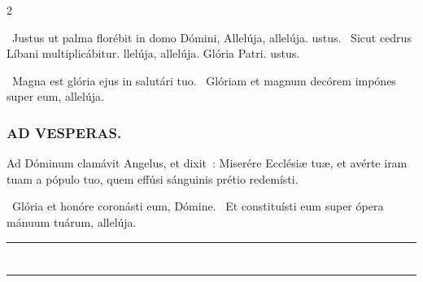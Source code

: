 \documentclass[9pt,twoside]{extarticle}
\begin{document}
\begin{multicols}{2}
\begin{tightlist}{}
\item {}~Justus ut palma florébit in domo Dómini, \textred{*} Allelúja, allelúja. ustus.
~Sicut cedrus Líbani multiplicábitur. llelúja, allelúja.
Glória Patri. ustus.
\item {}~Magna est glória ejus in salutári tuo. ~Glóriam et magnum decórem impónes super eum, allelúja.
\end{tightlist}

\subsubsection*{\center \textsc{AD VESPERAS.}}
\begin{tightlist}{}
\item {}
\item {} Ad Dóminum clamávit Angelus, et dixit~: Miserére Ecclésiæ tuæ, et avérte iram tuam a pópulo tuo, quem effúsi sánguinis prétio redemísti. 
\item {}~Glória et honóre coronásti eum, Dómine. ~Et constituísti eum super ópera mánuum tuárum, allelúja.
\item {}
\end{tightlist}


\begin{center}\textcolor{red}{\rule{\linewidth}{0.5pt}} \end{center}



\clearpage
{}
\renewcommand{\thepage}{[\arabic{page}]*}

\section*{\center \textsc{}}
\subsection*{\center \textsc{}}
\subsubsection*{\center {}}
\begin{center}\textcolor{red}{\rule{\linewidth}{0.5pt}} \end{center}


\end{multicols}
\end{document}
